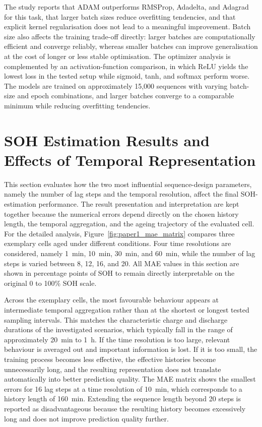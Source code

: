 \documentclass[
    a4paper,
    12pt,
    titlepage,
    bibliography=totoc,
    twoside=on,
    parskip=false,
    numbers=noenddot,
    cleardoublepage=empty,
    DIV=12,
    BCOR=12.0mm,
    headheight=36pt,
    headings=openright
]{scrreprt}
\begin{document}
The study reports that ADAM outperforms RMSProp, Adadelta, and Adagrad for this task, that larger batch sizes reduce overfitting tendencies, and that explicit kernel regularisation does not lead to a meaningful improvement. Batch size also affects the training trade-off directly: larger batches are computationally efficient and converge reliably, whereas smaller batches can improve generalisation at the cost of longer or less stable optimisation. The optimizer analysis is complemented by an activation-function comparison, in which ReLU yields the lowest loss in the tested setup while sigmoid, tanh, and softmax perform worse. The models are trained on approximately 15{,}000 sequences with varying batch-size and epoch combinations, and larger batches converge to a comparable minimum while reducing overfitting tendencies.

\section{SOH Estimation Results and Effects of Temporal Representation}
\label{sec:paper1_results}
This section evaluates how the two most influential sequence-design parameters, namely the number of lag steps and the temporal resolution, affect the final SOH-estimation performance. The result presentation and interpretation are kept together because the numerical errors depend directly on the chosen history length, the temporal aggregation, and the ageing trajectory of the evaluated cell. For the detailed analysis, Figure~\ref{fig:paper1_mae_matrix} compares three exemplary cells aged under different conditions. Four time resolutions are considered, namely \SI{1}{\minute}, \SI{10}{\minute}, \SI{30}{\minute}, and \SI{60}{\minute}, while the number of lag steps is varied between 8, 12, 16, and 20. All MAE values in this section are shown in percentage points of SOH to remain directly interpretable on the original 0 to 100\% SOH scale.

Across the exemplary cells, the most favourable behaviour appears at intermediate temporal aggregation rather than at the shortest or longest tested sampling intervals. This matches the characteristic charge and discharge durations of the investigated scenarios, which typically fall in the range of approximately \SI{20}{\minute} to \SI{1}{\hour}. If the time resolution is too large, relevant behaviour is averaged out and important information is lost. If it is too small, the training process becomes less effective, the effective histories become unnecessarily long, and the resulting representation does not translate automatically into better prediction quality. The MAE matrix shows the smallest errors for 16 lag steps at a time resolution of \SI{10}{\minute}, which corresponds to a history length of \SI{160}{\minute}. Extending the sequence length beyond 20 steps is reported as disadvantageous because the resulting history becomes excessively long and does not improve prediction quality further.
\end{document}

